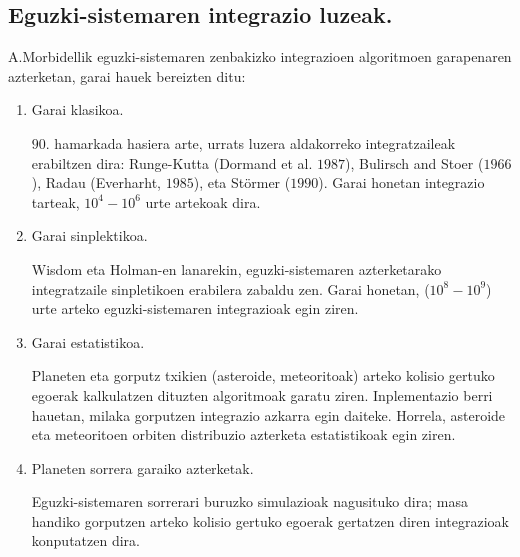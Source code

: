 %

\subsection*{Eguzki-sistemaren integrazio luzeak.} 


A.Morbidellik \cite{Morbidelli2002} eguzki-sistemaren zenbakizko integrazioen algoritmoen garapenaren azterketan, garai hauek bereizten ditu:
\begin{enumerate}

\item Garai klasikoa.

$90$. hamarkada hasiera arte, urrats luzera aldakorreko integratzaileak erabiltzen dira: Runge-Kutta (Dormand et al. $1987$), Bulirsch and Stoer ($1966$), Radau (Everharht, $1985$), eta Störmer ($1990$). Garai honetan integrazio tarteak, $10^4-10^6$ urte artekoak dira.  

\item Garai sinplektikoa.

Wisdom eta Holman-en \cite[1991]{Sussman1992} lanarekin, eguzki-sistemaren azterketarako integratzaile sinpletikoen erabilera zabaldu zen. Garai honetan, ($10^8-10^9$) urte arteko eguzki-sistemaren integrazioak egin ziren.  

\item Garai estatistikoa.

Planeten eta gorputz txikien (asteroide, meteoritoak) arteko kolisio gertuko egoerak kalkulatzen dituzten algoritmoak garatu ziren. Inplementazio berri hauetan, milaka gorputzen integrazio azkarra egin daiteke. Horrela, asteroide eta meteoritoen orbiten distribuzio azterketa estatistikoak egin ziren.

\item Planeten sorrera garaiko azterketak.

Eguzki-sistemaren sorrerari buruzko simulazioak nagusituko dira; masa handiko gorputzen arteko kolisio gertuko egoerak gertatzen diren integrazioak konputatzen dira. 
 
\end{enumerate}

